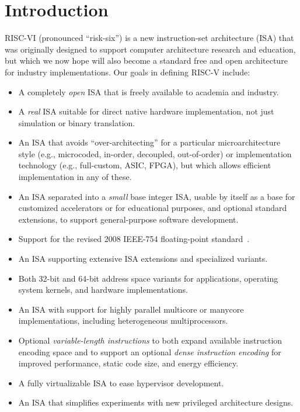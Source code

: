 \chapter{Introduction}

RISC-VI (pronounced ``risk-six'') is a new instruction-set
architecture (ISA) that was originally designed to support computer
architecture research and education, but which we now hope will also
become a standard free and open architecture for industry
implementations.  Our goals in defining RISC-V include:
\vspace{-0.1in}
\begin{itemize}
\parskip 0pt
\itemsep 1pt
\item A completely {\em open} ISA that is freely available to
  academia and industry.
\item A {\em real} ISA suitable for direct native hardware implementation,
  not just simulation or binary translation.
\item An ISA that avoids ``over-architecting'' for a particular
  microarchitecture style (e.g., microcoded, in-order, decoupled,
  out-of-order) or implementation technology (e.g., full-custom, ASIC,
  FPGA), but which allows efficient implementation in any of these.
\item An ISA separated into a {\em small} base integer ISA, usable by
  itself as a base for customized accelerators or for educational
  purposes, and optional standard extensions, to support
  general-purpose software development.
\item Support for the revised 2008 IEEE-754 floating-point standard~\cite{ieee754-2008}.
\item An ISA supporting extensive ISA extensions and
  specialized variants.
\item Both 32-bit and 64-bit address space variants for
  applications, operating system kernels, and hardware implementations.
\item An ISA with support for highly parallel multicore
  or manycore implementations, including heterogeneous multiprocessors.
\item Optional {\em variable-length instructions} to both expand available
  instruction encoding space and to support an optional {\em dense
  instruction encoding} for improved performance, static code size,
  and energy efficiency.
\item A fully virtualizable ISA to ease hypervisor development.
\item An ISA that simplifies experiments with new privileged architecture designs.
\end{itemize}
\vspace{-0.1in}

